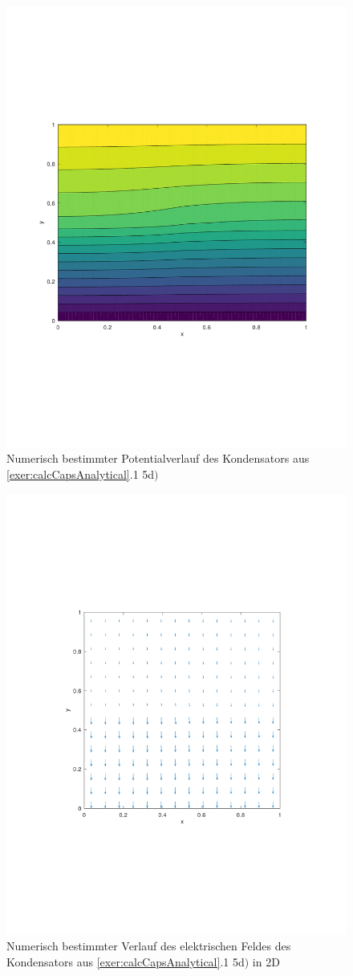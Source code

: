\documentclass[Protokollheft.tex]{subfiles}
\begin{document}
\begin{figure}[h!]
	\centering
	\includegraphics[trim = 20mm 70mm 20mm 70mm, clip,width=0.7\linewidth]{potential_D.pdf}
	\caption{Numerisch bestimmter Potentialverlauf des Kondensators aus \ref{exer:calcCapsAnalytical}.1 5d$)$}
\end{figure}

\begin{figure}[h!]
	\centering
	\includegraphics[trim = 20mm 70mm 20mm 70mm, clip,width=0.7\linewidth]{E_2D_D.pdf}
	\caption{Numerisch bestimmter Verlauf des elektrischen Feldes des Kondensators aus \ref{exer:calcCapsAnalytical}.1 5d$)$ in 2D}
\end{figure}
\end{document}
